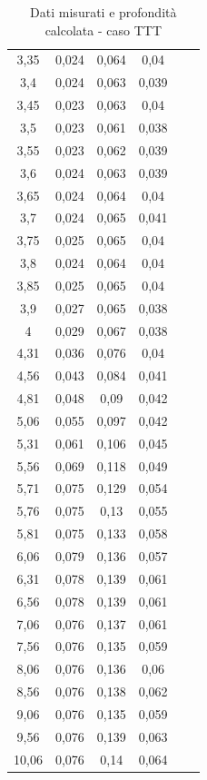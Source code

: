 \documentclass[12pt]{article} %
\begin{document}
\begin{table}[H]
\begin{tabular}{cccccc}
 3,35  &  0,024 &  0,064 &  0,04  &  &  \\
 3,4   &  0,024 &  0,063 &  0,039 &  &  \\
 3,45  &  0,023 &  0,063 &  0,04  &  &  \\
 3,5   &  0,023 &  0,061 &  0,038 &  &  \\
 3,55  &  0,023 &  0,062 &  0,039 &  &  \\
 3,6   &  0,024 &  0,063 &  0,039 &  &  \\
 3,65  &  0,024 &  0,064 &  0,04  &  &  \\
 3,7   &  0,024 &  0,065 &  0,041 &  &  \\
 3,75  &  0,025 &  0,065 &  0,04  &  &  \\
 3,8   &  0,024 &  0,064 &  0,04  &  &  \\
 3,85  &  0,025 &  0,065 &  0,04  &  &  \\
 3,9   &  0,027 &  0,065 &  0,038 &  &  \\
 4     &  0,029 &  0,067 &  0,038 &  &  \\
 4,31  &  0,036 &  0,076 &  0,04  &  &  \\
 4,56  &  0,043 &  0,084 &  0,041 &  &  \\
 4,81  &  0,048 &  0,09  &  0,042 &  &  \\
 5,06  &  0,055 &  0,097 &  0,042 &  &  \\
 5,31  &  0,061 &  0,106 &  0,045 &  &  \\
 5,56  &  0,069 &  0,118 &  0,049 &  &  \\
 5,71  &  0,075 &  0,129 &  0,054 &  &  \\
 5,76  &  0,075 &  0,13  &  0,055 &  &  \\
 5,81  &  0,075 &  0,133 &  0,058 &  &  \\
 6,06  &  0,079 &  0,136 &  0,057 &  &  \\
 6,31  &  0,078 &  0,139 &  0,061 &  &  \\
 6,56  &  0,078 &  0,139 &  0,061 &  &  \\
 7,06  &  0,076 &  0,137 &  0,061 &  &  \\
 7,56  &  0,076 &  0,135 &  0,059 &  &  \\
 8,06  &  0,076 &  0,136 &  0,06  &  &  \\
 8,56  &  0,076 &  0,138 &  0,062 &  &  \\
 9,06  &  0,076 &  0,135 &  0,059 &  &  \\
 9,56  &  0,076 &  0,139 &  0,063 &  &  \\
 10,06 &  0,076 &  0,14  &  0,064 &  &  \\
\hline
\end{tabular}
\caption{Dati misurati e profondità calcolata - caso TTT}
\label{tab:TTT}
\end{table}
\vspace*{\fill}
\newpage
\end{document}
